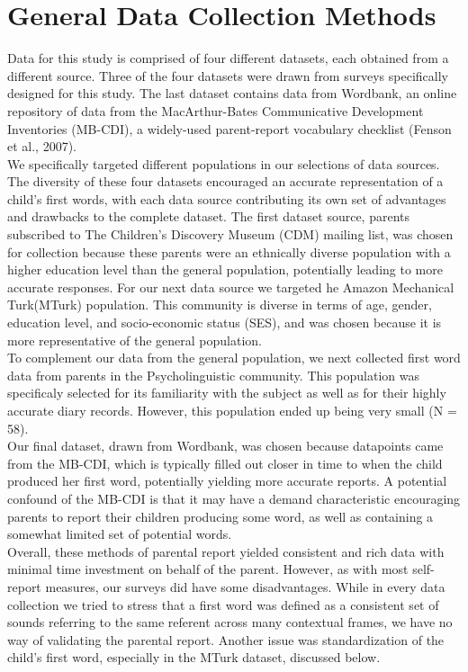 \documentclass[10pt,letterpaper]{article}
\begin{document}
\section{General Data Collection Methods}
Data for this study is comprised of four different datasets, each obtained from a different source. Three of the four datasets were drawn from surveys specifically designed for this study. The last dataset contains data from Wordbank, an online repository of data from the MacArthur-Bates Communicative Development Inventories (MB-CDI), a widely-used parent-report vocabulary checklist (Fenson et al., 2007).\\
We specifically targeted different populations in our selections of data sources. The diversity of these four datasets encouraged an accurate representation of a child's first words, with each data source contributing its own set of advantages and drawbacks to the complete dataset. The first dataset source,  parents subscribed to The Children's Discovery Museum (CDM) mailing list, was chosen for collection because these parents were an ethnically diverse population with a higher education level than the general population, potentially leading to more accurate responses. For our next data source we targeted he Amazon Mechanical Turk(MTurk) population. This community is diverse in terms of age, gender, education level, and socio-economic status (SES), and was chosen because it is more representative of the general population.\\
To complement our data from the general population, we next collected first word data from parents in the Psycholinguistic community. This population was specificaly selected for its familiarity with the subject as well as for their highly accurate diary records. However, this population ended up being very small (N = 58). \\
Our final dataset, drawn from Wordbank, was chosen because datapoints came from the MB-CDI, which is typically filled out closer in time to when the child produced her first word, potentially yielding more accurate reports. A potential confound of the MB-CDI is that it may have a demand characteristic encouraging parents to report their children producing some word, as well as containing a somewhat limited set of potential words. \\
Overall, these methods of parental report yielded consistent and rich data with minimal time investment on behalf of the parent. However, as with most self-report measures, our surveys did have some disadvantages. While in every data collection we tried to stress that a first word was defined as a consistent set of sounds referring to the same referent across many contextual frames, we have no way of validating the parental report. Another issue was standardization of the child's first word, especially in the MTurk dataset, discussed below. 
\end{document}
